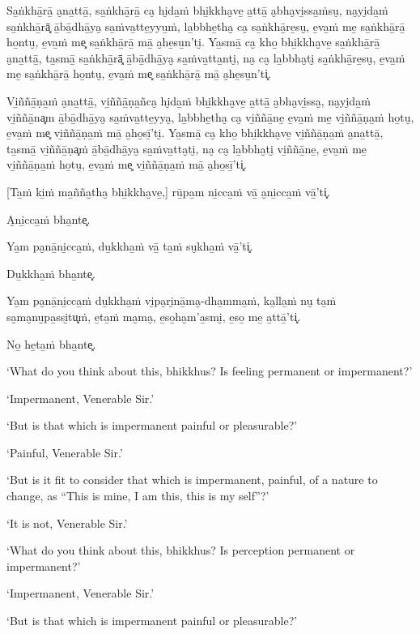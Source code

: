 Sa̱ṅkhā̱rā̱ a̮na̱ttā̱, sa̱ṅkhā̱rā̱ ca̮ hi̮da̱ṁ bhi̱kkha̮ve̱ a̱ttā̱ a̮bha̮vi̱ssa̱ṁsu̮, na̮yi̮da̱ṁ sa̱ṅkhā̱rā͓
ā̱bā̱dhā̱ya̮ sa̱ṁva̱tte̱yyu̱ṁ, la̱bbhe̱tha̮ ca̮ sa̱ṅkhā̱re̱su̮, e̱va̱ṁ me̱ sa̱ṅkhā̱rā̱ ho̱ntu̮, e̱va̱ṁ me͓
sa̱ṅkhā̱rā̱ mā̱ a̮he̱su̱n'ti̮. Ya̱smā̱ ca̮ kho̱ bhi̱kkha̮ve̱ sa̱ṅkhā̱rā̱ a̮na̱ttā̱, ta̱smā̱ sa̱ṅkhā̱rā͓
ā̱bā̱dhā̱ya̮ sa̱ṁva̱tta̱nti̮, na̮ ca̮ la̱bbha̮ti̮ sa̱ṅkhā̱re̱su̮, e̱va̱ṁ me̱ sa̱ṅkhā̱rā̱ ho̱ntu̮, e̱va̱ṁ me͓
sa̱ṅkhā̱rā̱ mā̱ a̮he̱su̱n'ti͓.

Vi̱ññā̱ṇa̱ṁ a̮na̱ttā̱, vi̱ññā̱ṇa̱ñca̮ hi̮da̱ṁ bhi̱kkha̮ve̱ a̱ttā̱ a̮bha̮vi̱ssa̮, na̮yi̮da̱ṁ vi̱ññā̱na͓m
ā̱bā̱dhā̱ya̮ sa̱ṁva̱tte̱yya̮, la̱bbhe̱tha̮ ca̮ vi̱ññā̱ne̱ e̱va̱ṁ me̱ vi̱ññā̱ṇa̱ṁ ho̱tu̮, e̱va̱ṁ me͓
vi̱ññā̱ṇa̱ṁ mā̱ a̮ho̱sī̱'ti̮. Ya̱smā̱ ca̮ kho̱ bhi̱kkha̮ve̱ vi̱ññā̱ṇa̱ṁ a̮na̱ttā̱, ta̱smā̱ vi̱ññā̱ṇa͓ṁ
ā̱bā̱dhā̱ya̮ sa̱ṁva̱tta̮ti̮, na̮ ca̮ la̱bbha̮ti̮ vi̱ññā̱ne̱, e̱va̱ṁ me̱ vi̱ññā̱ṇa̱ṁ ho̱tu̮, e̱va̱ṁ me͓
vi̱ññā̱ṇa̱ṁ mā̱ a̮ho̱sī̱'ti͓.

[Ta̱ṁ ki̱ṁ ma̱ñña̮tha̮ bhi̱kkha̮ve̱,] rū̱pa̱m ni̱cca̱ṁ vā̱ a̮ni̱cca̱ṁ vā̱'ti͓.

A̮ni̱cca̱ṁ bha̱nte͓.

Ya̱m pa̮nā̱ni̱cca̱ṁ, du̱kkha̱ṁ vā̱ ta̱ṁ su̮kha̱ṁ vā̱'ti͓.

Du̱kkha̱ṁ bha̱nte͓.

Ya̱m pa̮nā̱ni̱cca̱ṁ du̱kkha̱ṁ vi̮pa̮ri̮nā̱ma̮-dha̱mma̱ṁ, ka̱lla̱ṁ nu̮ ta̱ṁ sa̮ma̮nu̮pa̱ssi̮tu͓ṁ,
e̱ta̱ṁ ma̮ma̮, e̱so̱ha̮m'a̱smi̮, e̱so̱ me̱ a̱ttā̱'ti͓.

No̱ he̱ta̱ṁ bha̱nte͓.

\clearpage

\englishText
\markboth{\englishTitle}{\rightmark}

‘What do you think about this, bhikkhus? Is feeling permanent or
impermanent?’

‘Impermanent, Venerable Sir.’

‘But is that which is impermanent painful or pleasurable?’

‘Painful, Venerable Sir.’

‘But is it fit to consider that which is impermanent, painful, of a
nature to change, as “This is mine, I am this, this is my self”?’

‘It is not, Venerable Sir.’

‘What do you think about this, bhikkhus? Is perception permanent or
impermanent?’

‘Impermanent, Venerable Sir.’

‘But is that which is impermanent painful or pleasurable?’

